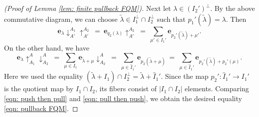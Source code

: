 \documentclass[12pt]{amsart}
\numberwithin{equation}{section}
\theoremstyle{definition}
\theoremstyle{remark}
\begin{document}
\begin{proof}[(Proof of Lemma \ref{lem: finite pullback FQM})]

Next let $\lambda\in (I_{2}')^{\perp}$. 
By the above commutative diagram, 
we can choose $\tilde{\lambda}\in I_1^{\perp}\cap I_2^{\perp}$ such that 
$p_{1}'(\tilde{\lambda})=\lambda$. 
Then 
\begin{equation}\label{eqn: push then pull}
\mathbf{e}_{\lambda}\downarrow^{A_{1}}_{A'} \uparrow_{A'}^{A_{2}} \: = \: 
\mathbf{e}_{q_{2}(\lambda)}\uparrow^{A_{2}}_{A'} \: = \: 
\sum_{\mu'\in I_{1}'} \mathbf{e}_{p_{2}'(\tilde{\lambda})+\mu'}. 
\end{equation}
On the other hand, we have 
\begin{equation}\label{eqn: pull then push}
\mathbf{e}_{\lambda}\uparrow_{A_{1}}^{A}\downarrow^{A}_{A_{2}} 
\: = \:  
\sum_{\mu\in I_{1}} \mathbf{e}_{\tilde{\lambda}+\mu}\downarrow^{A}_{A_{2}}  
\: = \: 
\sum_{\mu\in \hat{I}_{1}'} \mathbf{e}_{p_{2}(\tilde{\lambda}+\mu)} 
\: = \: 
\sum_{\mu\in \hat{I}_{1}'} \mathbf{e}_{p_{2}'(\tilde{\lambda})+p_{2}'(\mu)}.  
\end{equation}
Here we used the equality 
$(\tilde{\lambda}+I_{1}) \cap I_{2}^{\perp} = \tilde{\lambda}+\hat{I}_{1}'$. 
Since the map 
$p_{2}'\colon \hat{I}_{1}'\to I_{1}'$ 
is the quotient map by $I_{1}\cap I_{2}$, 
its fibers consist of $|I_{1}\cap I_{2}|$ elements. 
Comparing \eqref{eqn: push then pull} and \eqref{eqn: pull then push},  
we obtain the desired equality \eqref{eqn: pullback FQM}. 
\end{proof}
\end{document}
